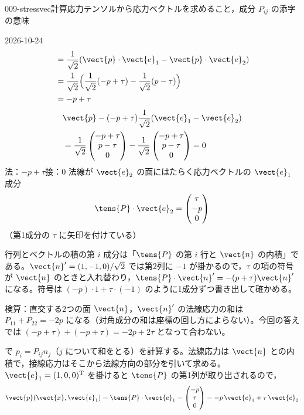 \documentclass[uplatex,dvipdfmx,a4paper,11pt]{jsarticle}
\begin{document}
\begin{mondai}{009-stressvec}{計算}{応力テンソルから応力ベクトルを求めること，成分 $P_{ij}$ の添字の意味}
\begin{kotaeutsushi}{2026-10-24}
\begin{align*}
&=\frac{1}{\sqrt{2}}(\vect{p}\cdot\vect{e}_{1}-\vect{p}\cdot\vect{e}_{2})\\
&=\frac{1}{\sqrt{2}}\Bigl(\frac{1}{\sqrt{2}}(-p+\tau)-\frac{1}{\sqrt{2}}(p-\tau)\Bigr)\\
&=-p+\tau
\end{align*}
\begin{align*}
&\vect{p}-(-p+\tau)\frac{1}{\sqrt{2}}(\vect{e}_{1}-\vect{e}_{2})\\
&=\frac{1}{\sqrt{2}}\begin{pmatrix}-p+\tau\\p-\tau\\0\end{pmatrix}-\frac{1}{\sqrt{2}}\begin{pmatrix}-p+\tau\\p-\tau\\0\end{pmatrix}=0
\end{align*}
法：$-p+\tau$\quad 接：$0$
法線が $\vect{e}_{2}$ の面にはたらく応力ベクトルの $\vect{e}_{1}$ 成分
\[ \tens{P}\cdot\vect{e}_{2}=\begin{pmatrix}\tau\\-p\\0\end{pmatrix} \]
（第1成分の $\tau$ に矢印を付けている）
\end{kotaeutsushi}
\begin{kizuki}
\item 行列とベクトルの積の第 $i$ 成分は「$\tens{P}$ の第 $i$ 行と $\vect{n}$ の内積」である。$\vect{n}'=(1,-1,0)/\sqrt{2}$ では第2列に $-1$ が掛かるので，$\tau$ の項の符号が $\vect{n}$ のときと入れ替わり，$\tens{P}\cdot\vect{n}'=-(p+\tau)\vect{n}'$ になる。符号は $(-p)\cdot1+\tau\cdot(-1)$ のように1成分ずつ書き出して確かめる。
\item 検算：直交する2つの面 $\vect{n}$，$\vect{n}'$ の法線応力の和は $P_{11}+P_{22}=-2p$ になる（対角成分の和は座標の回し方によらない）。今回の答えでは $(-p+\tau)+(-p+\tau)=-2p+2\tau$ となって合わない。
\end{kizuki}
\begin{tadashii}
\houshin {} で $p_i=P_{ij}n_j$（$j$ について和をとる）を計算する。法線応力は $\vect{n}$ との内積で，接線応力はそこから法線方向の部分を引いて求める。
\keisan {} $\vect{e}_1=(1,0,0)^{\mathrm{T}}$ を掛けると $\tens{P}$ の第1列が取り出されるので，
\[ \vect{p}(\vect{x},\vect{e}_1)=\tens{P}\cdot\vect{e}_1=\begin{pmatrix}-p\\ \tau\\ 0\end{pmatrix}=-p\,\vect{e}_1+\tau\,\vect{e}_2 \]

\end{tadashii}
\end{mondai}
\end{document}
